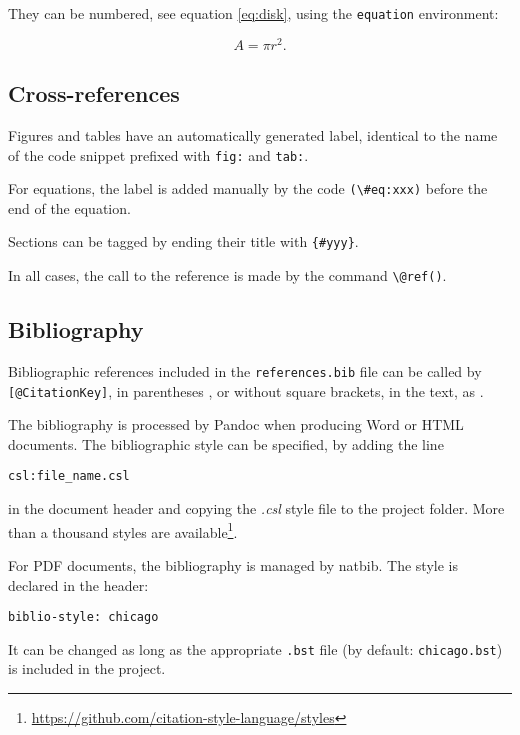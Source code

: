 \documentclass[fleqn,10pt]{latex/stylish_article} %
\begin{document}
They can be numbered, see equation \eqref{eq:disk}, using the \texttt{equation} environment:

\begin{equation}
  A = \pi r^2.
  \label{eq:disk}
\end{equation}

\subsection{Cross-references}\label{cross-references}

Figures and tables have an automatically generated label, identical to the name of the code snippet prefixed with \texttt{fig:} and \texttt{tab:}.

For equations, the label is added manually by the code \texttt{(\textbackslash{}\#eq:xxx)} before the end of the equation.

Sections can be tagged by ending their title with \texttt{\{\#yyy\}}.

In all cases, the call to the reference is made by the command \texttt{\textbackslash{}@ref()}.

\subsection{Bibliography}\label{bibliography}

Bibliographic references included in the \texttt{references.bib} file can be called by \texttt{{[}@CitationKey{]}}, in parentheses \citep{Xie2016}, or without square brackets, in the text, as \citet{Xie2018} .

The bibliography is processed by Pandoc when producing Word or HTML documents.
The bibliographic style can be specified, by adding the line

\begin{verbatim}
csl:file_name.csl
\end{verbatim}

in the document header and copying the \emph{.csl} style file to the project folder.
More than a thousand styles are available\footnote{\url{https://github.com/citation-style-language/styles}}.

For PDF documents, the bibliography is managed by natbib.
The style is declared in the header:

\begin{verbatim}
biblio-style: chicago
\end{verbatim}

It can be changed as long as the appropriate \texttt{.bst} file (by default: \texttt{chicago.bst}) is included in the project.
\end{document}
